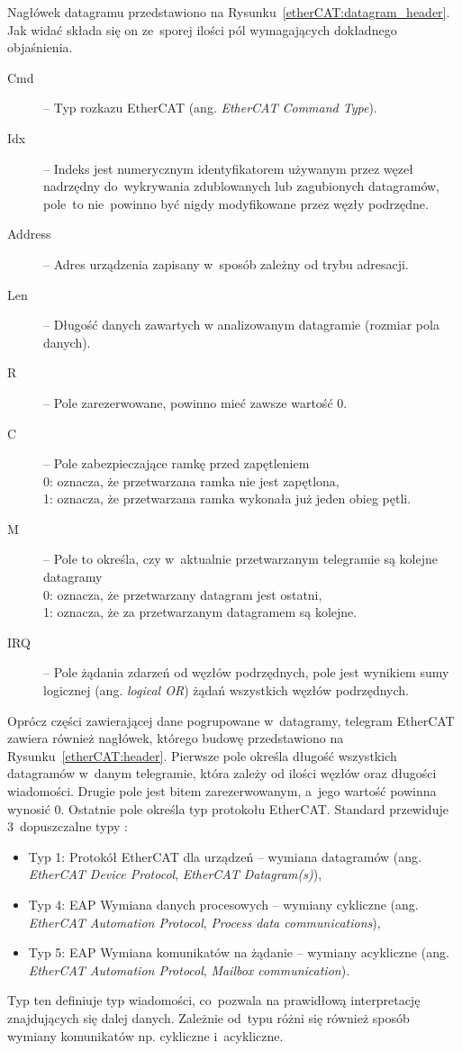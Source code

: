 Nagłówek datagramu przedstawiono na Rysunku~\ref{etherCAT:datagram_header}. Jak widać składa się on ze~sporej ilości pól wymagających dokładnego objaśnienia.
\begin{description}
\item[Cmd] -- Typ rozkazu EtherCAT (ang. \textit{EtherCAT Command Type}).
\item[Idx] -- Indeks jest numerycznym identyfikatorem używanym przez węzeł nadrzędny do~wykrywania zdublowanych lub zagubionych datagramów, pole~to nie~powinno być nigdy modyfikowane przez węzły podrzędne.
\item[Address] -- Adres urządzenia zapisany w~sposób zależny od trybu adresacji.
\item[Len] -- Długość danych zawartych w analizowanym datagramie (rozmiar pola danych).
\item[R] -- Pole zarezerwowane, powinno mieć zawsze wartość 0.
\item[C] -- Pole zabezpieczające ramkę przed zapętleniem\\
0: oznacza, że przetwarzana ramka nie jest zapętlona,\\
1: oznacza, że przetwarzana ramka wykonała już jeden obieg pętli.
\item[M] -- Pole to określa, czy w~aktualnie przetwarzanym telegramie są kolejne datagramy \\
0: oznacza, że przetwarzany datagram jest ostatni, \\
1: oznacza, że za przetwarzanym datagramem są kolejne.
\item[IRQ] -- Pole żądania zdarzeń od węzłów podrzędnych, pole jest wynikiem sumy logicznej (ang. \textit{logical OR}) żądań wszystkich węzłów podrzędnych.
\end{description}


Oprócz części zawierającej dane pogrupowane w~datagramy, telegram EtherCAT zawiera również nagłówek, którego budowę  przedstawiono na Rysunku~\ref{etherCAT:header}. Pierwsze pole określa długość wszystkich datagramów w~danym telegramie, która zależy od ilości węzłów oraz długości wiadomości. Drugie pole jest bitem zarezerwowanym, a~jego wartość powinna wynosić 0. Ostatnie pole określa typ protokołu EtherCAT. 
\clearpage
Standard przewiduje 3~dopuszczalne typy \cite{kurs1}:
\begin{itemize}
\item Typ 1: Protokół EtherCAT dla urządzeń -- wymiana datagramów (ang. \textit{EtherCAT Device Protocol}, \textit{EtherCAT Datagram(s)}),
\item Typ 4: EAP Wymiana danych procesowych -- wymiany cykliczne (ang. \textit{EtherCAT Automation Protocol}, \textit{Process data communications}),
\item Typ 5: EAP Wymiana komunikatów na żądanie -- wymiany acykliczne (ang. \textit{EtherCAT Automation Protocol}, \textit{Mailbox communication}).
\end{itemize}
Typ ten definiuje typ wiadomości, co~pozwala na prawidłową interpretację znajdujących się dalej danych. Zależnie od~typu różni się również sposób wymiany komunikatów np. cykliczne i~acykliczne.
\vspace{-3mm}

